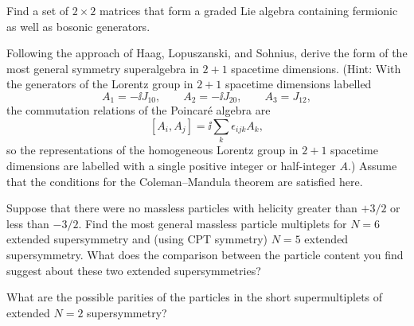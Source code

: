 
\begin{enumerate}
   Find a set of $2\times 2$ matrices that form a graded Lie algebra
  containing fermionic as well as bosonic generators.

   Following the approach of Haag, Lopuszanski, and Sohnius, derive
  the form of the most general symmetry superalgebra in $2+1$ spacetime
  dimensions. (Hint: With the generators of the Lorentz group in $2+1$
  spacetime dimensions labelled
  \[
    A_1=-\ii J_{10},\qquad A_2=-\ii J_{20},\qquad A_3=J_{12},
  \]
  the commutation relations of the Poincar\'e algebra are
  \[
    [A_i,A_j]=\ii\sum_k\epsilon_{ijk}A_k,
  \]
  so the representations of the homogeneous Lorentz group in $2+1$
  spacetime dimensions are labelled with a single positive integer or
  half-integer $A$.) Assume that the conditions for the Coleman--Mandula
  theorem are satisfied here.

   Suppose that there were no massless particles with helicity greater
  than $+3/2$ or less than $-3/2$. Find the most general massless particle
  multiplets for $N=6$ extended supersymmetry and (using CPT symmetry)
  $N=5$ extended supersymmetry. What does the comparison between the
  particle content you find suggest about these two extended
  supersymmetries?

   What are the possible parities of the particles in the short
  supermultiplets of extended $N=2$ supersymmetry?
\end{enumerate}
